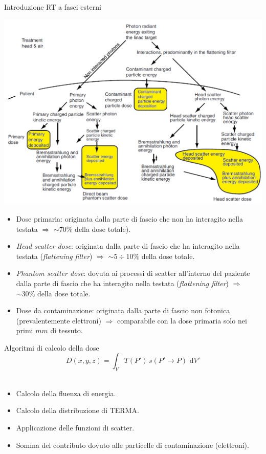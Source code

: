 \documentclass{beamer}
\newcommand{\de}{\,\textrm{d}}
\begin{document}
\begin{frame}{Introduzione RT a fasci esterni}
\begin{center}
\small
\includegraphics[width=.6\textwidth]{../cap1/processes.PNG}
\end{center}
\begin{itemize}
\scriptsize
\item \alert{Dose primaria:} originata dalla parte di fascio che non ha interagito nella testata $\Rightarrow$ $\sim 70\%$ della dose totale).
\item \alert{\textit{Head scatter dose}:} originata dalla parte di fascio che ha interagito nella testata (\textit{flattening filter}) $\Rightarrow$ $\sim 5\div 10\%$ della dose totale.
\item \alert{\textit{Phantom scatter dose}:} dovuta ai processi di scatter all'interno del paziente dalla parte di fascio che ha interagito nella testata (\textit{flattening filter}) $\Rightarrow$ $\sim 30\%$ della dose totale.
\item \alert{Dose da contaminazione:} originata dalla parte di fascio non fotonica (prevalentemente elettroni) $\Rightarrow$ comparabile con la dose primaria solo nei primi $mm$ di tessuto.
\end{itemize}
\end{frame}



\begin{frame}{Algoritmi di calcolo della dose}
\small $$D(x,y,z) = \int_V T(P')\,s(P'\rightarrow P)\, \de V'$$\\ \vspace{.5cm}
\begin{itemize}
\footnotesize
\item Calcolo della fluenza di energia.
\item Calcolo della distribuzione di TERMA.
\item Applicazione delle funzioni di scatter.
\item Somma del contributo dovuto alle particelle di contaminazione (elettroni).
\end{itemize}

\end{frame}
\end{document}
